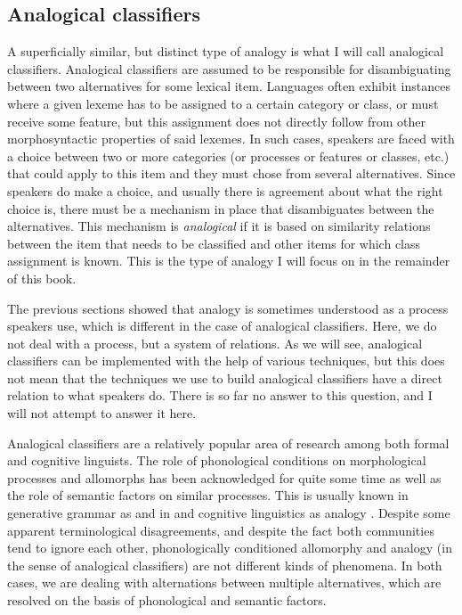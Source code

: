 
\subsection{Analogical classifiers}

A superficially similar, but distinct type of analogy is what I will call analogical classifiers. Analogical classifiers are assumed to be responsible for disambiguating between two alternatives for some lexical item. Languages often exhibit instances where a given lexeme has to be assigned to a certain category or class, or must receive some feature, but this assignment does not directly follow from other morphosyntactic properties of said lexemes. In such cases, speakers are faced with a choice between two or more categories (or processes or features or classes, etc.) that could apply to this item and they must chose from several alternatives. Since speakers do make a choice, and usually there is agreement about what the right choice is, there must be a mechanism in place that disambiguates between the alternatives. This mechanism is \textit{analogical} if it is based on similarity relations between the item that needs to be classified and other items for which class assignment is known. This is the type of analogy I will focus on in the remainder of this book.

The previous sections showed that analogy is sometimes understood as a process speakers use, which is different in the case of analogical classifiers. Here, we do not deal with a process, but a system of relations. As we will see, analogical classifiers can be implemented with the help of various techniques, but this does not mean that the techniques we use to build analogical classifiers have a direct relation to what speakers do. There is so far no answer to this question, and I will not attempt to answer it here.

Analogical classifiers are a relatively popular area of research among both formal and cognitive linguists. The role of phonological conditions on morphological processes and allomorphs has been acknowledged for quite some time \autocites{Kurylowicz.1945, Bybee.1982, Carstairs.1990} as well as the role of semantic factors \autocite{Malkiel.1988} on similar processes. This is usually known in generative grammar as  \autocite{Nevins.2011a} and in  and cognitive linguistics as analogy \autocite{Bybee.1982}. Despite some apparent terminological disagreements, and despite the fact both communities tend to ignore each other, phonologically conditioned allomorphy and analogy (in the sense of analogical classifiers) are not different kinds of phenomena. In both cases, we are dealing with alternations between multiple alternatives, which are resolved on the basis of phonological and semantic factors.

